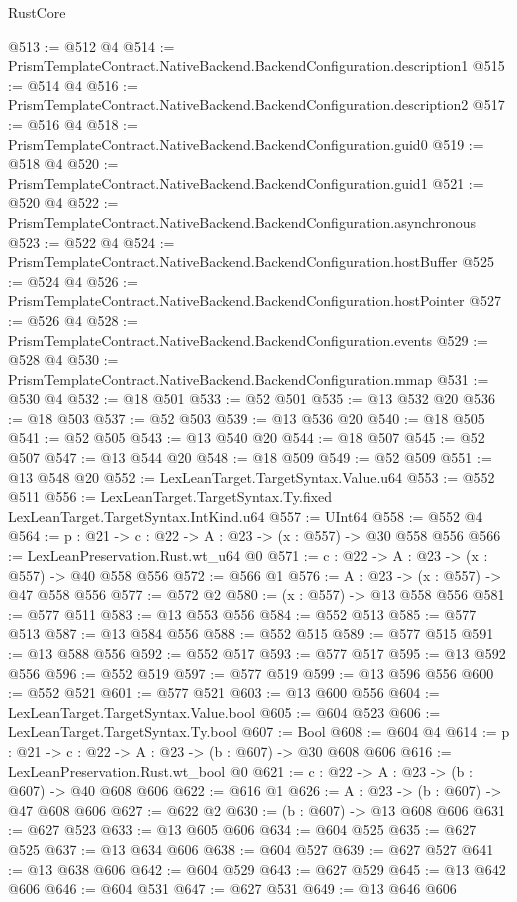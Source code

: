 \begin{lexlean}{RustCore}
\begin{coremodule}
@513 := @512 @4
@514 := PrismTemplateContract.NativeBackend.BackendConfiguration.description1
@515 := @514 @4
@516 := PrismTemplateContract.NativeBackend.BackendConfiguration.description2
@517 := @516 @4
@518 := PrismTemplateContract.NativeBackend.BackendConfiguration.guid0
@519 := @518 @4
@520 := PrismTemplateContract.NativeBackend.BackendConfiguration.guid1
@521 := @520 @4
@522 := PrismTemplateContract.NativeBackend.BackendConfiguration.asynchronous
@523 := @522 @4
@524 := PrismTemplateContract.NativeBackend.BackendConfiguration.hostBuffer
@525 := @524 @4
@526 := PrismTemplateContract.NativeBackend.BackendConfiguration.hostPointer
@527 := @526 @4
@528 := PrismTemplateContract.NativeBackend.BackendConfiguration.events
@529 := @528 @4
@530 := PrismTemplateContract.NativeBackend.BackendConfiguration.mmap
@531 := @530 @4
@532 := @18 @501
@533 := @52 @501
@535 := @13 @532 @20
@536 := @18 @503
@537 := @52 @503
@539 := @13 @536 @20
@540 := @18 @505
@541 := @52 @505
@543 := @13 @540 @20
@544 := @18 @507
@545 := @52 @507
@547 := @13 @544 @20
@548 := @18 @509
@549 := @52 @509
@551 := @13 @548 @20
@552 := LexLeanTarget.TargetSyntax.Value.u64
@553 := @552 @511
@556 := LexLeanTarget.TargetSyntax.Ty.fixed LexLeanTarget.TargetSyntax.IntKind.u64
@557 := UInt64
@558 := @552 @4
@564 := {p : @21} -> {c : @22} -> {A : @23} -> (x : @557) -> @30 @558 @556
@566 := LexLeanPreservation.Rust.wt_u64 @0
@571 := {c : @22} -> {A : @23} -> (x : @557) -> @40 @558 @556
@572 := @566 @1
@576 := {A : @23} -> (x : @557) -> @47 @558 @556
@577 := @572 @2
@580 := (x : @557) -> @13 @558 @556
@581 := @577 @511
@583 := @13 @553 @556
@584 := @552 @513
@585 := @577 @513
@587 := @13 @584 @556
@588 := @552 @515
@589 := @577 @515
@591 := @13 @588 @556
@592 := @552 @517
@593 := @577 @517
@595 := @13 @592 @556
@596 := @552 @519
@597 := @577 @519
@599 := @13 @596 @556
@600 := @552 @521
@601 := @577 @521
@603 := @13 @600 @556
@604 := LexLeanTarget.TargetSyntax.Value.bool
@605 := @604 @523
@606 := LexLeanTarget.TargetSyntax.Ty.bool
@607 := Bool
@608 := @604 @4
@614 := {p : @21} -> {c : @22} -> {A : @23} -> (b : @607) -> @30 @608 @606
@616 := LexLeanPreservation.Rust.wt_bool @0
@621 := {c : @22} -> {A : @23} -> (b : @607) -> @40 @608 @606
@622 := @616 @1
@626 := {A : @23} -> (b : @607) -> @47 @608 @606
@627 := @622 @2
@630 := (b : @607) -> @13 @608 @606
@631 := @627 @523
@633 := @13 @605 @606
@634 := @604 @525
@635 := @627 @525
@637 := @13 @634 @606
@638 := @604 @527
@639 := @627 @527
@641 := @13 @638 @606
@642 := @604 @529
@643 := @627 @529
@645 := @13 @642 @606
@646 := @604 @531
@647 := @627 @531
@649 := @13 @646 @606

\end{coremodule}
\end{lexlean}
